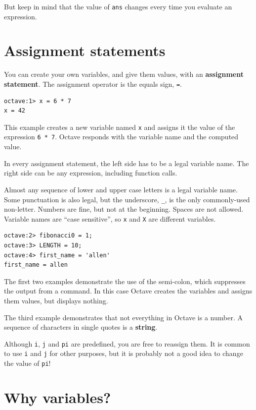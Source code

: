 \documentclass{book}
\begin{document}
But keep in mind that the value of {\tt ans} changes every time
you evaluate an expression.


\section{Assignment statements}

You can create your own variables, and give them values, with
an {\bf assignment statement}. The assignment operator is the
equals sign, {\tt =}.

\begin{verbatim}
octave:1> x = 6 * 7
x = 42
\end{verbatim}

This example creates a new variable named {\tt x} and assigns it the
value of the expression {\tt 6 * 7}. Octave responds with the
variable name and the computed value.

In every assignment statement, the left side has to be a
legal variable name. The right side can be any expression,
including function calls.

Almost any sequence of lower and upper case letters is a legal
variable name. Some punctuation is also legal, but the underscore,
{\tt \_}, is the only commonly-used non-letter. Numbers are fine, but
not at the beginning. Spaces are not allowed. Variable names are
``case sensitive'', so {\tt x} and {\tt X} are different variables.

\begin{verbatim}
octave:2> fibonacci0 = 1;
octave:3> LENGTH = 10;
octave:4> first_name = 'allen'
first_name = allen
\end{verbatim}

The first two examples demonstrate the use of the semi-colon, which
suppresses the output from a command. In this case Octave creates the
variables and assigns them values, but displays nothing.

The third example demonstrates that not everything
in Octave is a number. A sequence of characters in single quotes is
a {\bf string}.

Although {\tt i}, {\tt j} and {\tt pi} are predefined, you are free
to reassign them. It is common to use {\tt i} and {\tt j} for other
purposes, but it is probably not a good idea to change the value of
{\tt pi}!

\section{Why variables?}
\end{document}
